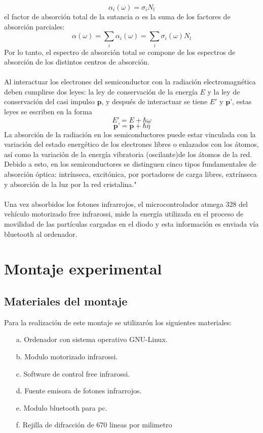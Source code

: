 \documentclass[12]{article}
\begin{document}
\begin{multicols}{2}
\begin{equation}
\alpha_{i}(\omega) = \sigma_{i} N_{l}
\end{equation}
el factor de absorción total de la sutancia $\alpha$ es la suma de los factores de absorción parciales:
\begin{equation}
\alpha(\omega) = \sum_{i} \alpha_{i}(\omega) = \sum_{i} \sigma_{i}(\omega)N_{l}
\end{equation}
Por lo tanto, el espectro de absorción total se compone de los espectros de absorción de los distintos centros de absorción. \\\\
Al interactuar los electrones del semiconductor con la radiación electromagnética deben cumplirse dos leyes: la ley de conservación de la energía  $E$ y la ley de conservación del casi impulso $\textbf{p}$, y después de interactuar se tiene $E'$ y $\textbf{p'}$, estas leyes se escriben en la forma 
\begin{equation}
E' = E + \hbar \omega
\end{equation}
\begin{equation}
\textbf{p'} = \textbf{p} + \hbar \bar{\eta}
\end{equation}
La absorción de la radiación en los semiconductores puede estar vinculada con la variación del estado energético de los electrones libres o enlazados con los átomos, así como la variación de la energía vibratoria (oscilante)de los átomos de la red. Debido a esto, en los semiconductores se distinguen cinco tipos fundamentales  de absorción óptica: intrínseca, excitónica, por portadores de carga libres, extrínseca y absorción de la luz por la red cristalina."\cite{ESTADO_SOLIDO} \\\\
Una vez absorbidos los fotones infrarrojos, el microcontrolador atmega 328 del vehículo motorizado free infrarossi, mide la energía utilizada en el proceso de movilidad de las partículas cargadas en el diodo y esta información es enviada vía bluetooth al ordenador.
\section{Montaje experimental}
\subsection{Materiales del montaje}
Para la realización de este montaje se utilizarón los siguientes materiales:
\begin{enumerate}
\item[a.] Ordenador con sistema operativo GNU-Linux.
\item[b.] Modulo motorizado infrarossi.
\item[c.] Software de control free infrarossi.
\item[d.] Fuente emisora de fotones infrarrojos.
\item[e.] Modulo bluetooth para pc.
\item[f.] Rejilla de difracción de 670 lineas por milimetro 
\end{enumerate}

\end{multicols}
\end{document}
